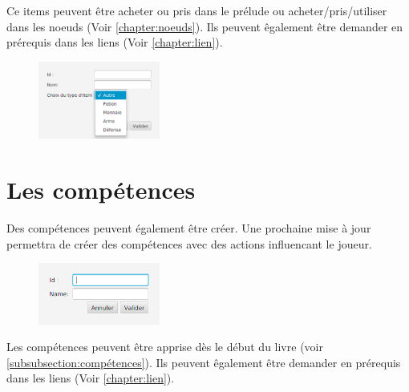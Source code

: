 		Ce items peuvent être acheter ou pris dans le prélude ou acheter/pris/utiliser dans les noeuds (Voir \ref{chapter:noeuds}). Ils peuvent êgalement être demander en prérequis dans les liens (Voir \ref{chapter:lien}).
	\begin{figure}[H]
		\centering\includegraphics[width=4cm]{img/inclusItems.png}
	\end{figure}

	\section{Les compétences}
		Des compétences peuvent également être créer. Une prochaine mise à jour permettra de créer des compétences avec des actions influencant le joueur.
		\begin{figure}[H]
			\centering\includegraphics[width=4cm]{img/inclusSkills.png}
		\end{figure}

		Les compétences peuvent être apprise dès le début du livre (voir \ref{subsubsection:compétences}). Ils peuvent êgalement être demander en prérequis dans les liens (Voir \ref{chapter:lien}).
